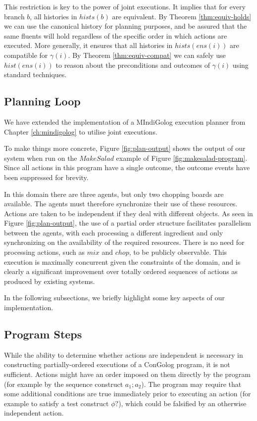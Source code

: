 This restriction is key to the power of joint executions. It implies
that for every branch $b$, all histories in $hists(b)$ are equivalent.
By Theorem \ref{thm:equiv-holds} we can use the canonical history
for planning purposes, and be assured that the same fluents will hold
regardless of the specific order in which actions are executed. More
generally, it ensures that all histories in $hists(ens(i))$ are compatible
for $\gamma(i)$. By Theorem \ref{thm:equiv-compat} we can safely
use $hist(ens(i))$ to reason about the preconditions and outcomes
of $\gamma(i)$ using standard techniques.


\subsection{Planning Loop}

We have extended the implementation of a MIndiGolog execution planner
from Chapter \ref{ch:mindigolog} to utilise joint executions.

To make things more concrete, Figure \ref{fig:plan-output} shows
the output of our system when run on the $MakeSalad$ example of Figure
\ref{fig:makesalad-program}. Since all actions in this program have
a single outcome, the outcome events have been suppressed for brevity.

In this domain there are three agents, but only two chopping boards
are available. The agents must therefore synchronize their use of
these resources. Actions are taken to be independent if they deal
with different objects. As seen in Figure \ref{fig:plan-output},
the use of a partial order structure facilitates parallelism between
the agents, with each processing a different ingredient and only synchronizing
on the availability of the required resources. There is no need for
processing actions, such as $mix$ and $chop$, to be publicly observable.
This execution is maximally concurrent given the constraints of the
domain, and is clearly a significant improvement over totally ordered
sequences of actions as produced by existing systems.

In the following subsections, we briefly highlight some key aspects
of our implementation.


\subsection{Program Steps}

While the ability to determine whether actions are independent is
necessary in constructing partially-ordered executions of a ConGolog
program, it is not sufficient. Actions might have an order imposed
on them directly by the program (for example by the sequence construct
$a_{1};a_{2}$). The program may require that some additional conditions
are true immediately prior to executing an action (for example to
satisfy a test construct $\phi?$), which could be falsified by an
otherwise independent action.


